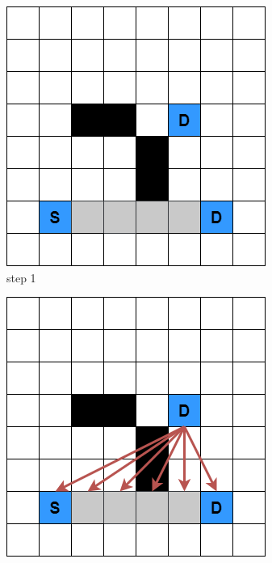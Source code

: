     \begin{figure}
        \centering

        \begin{subfigure}[b]{0.3\linewidth}
            \includegraphics[width=\linewidth]{figures/Steiner Stages/steiner_1.png}
            \caption{step 1}
        \end{subfigure}
        \begin{subfigure}[b]{0.3\linewidth}
            \includegraphics[width=\linewidth]{figures/Steiner Stages/steiner_2.png}

\end{subfigure}
\end{figure}
